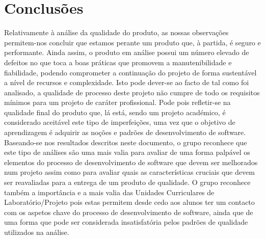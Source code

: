 \documentclass[openany,10pt,a4paper]{article}
\begin{document}
\section{Conclusões}
Relativamente à análise da qualidade do produto, as nossas observações permitem-nos concluir que estamos perante um produto que, à partida, é seguro e performante. Ainda assim, o produto em análise possui um número elevado de defeitos no que toca a boas práticas que promovem a manutenibilidade e fiabilidade, podendo comprometer a continuação do projeto de forma sustentável a nível de recursos e complexidade. 
Isto pode dever-se ao facto de tal como foi analisado, a qualidade de processo deste projeto não cumpre de todo os requisitos mínimos para um projeto de caráter profissional. Pode pois refletir-se na qualidade final do produto que, lá está, sendo um projeto académico, é considerado aceitável este tipo de imperfeições, uma vez que o objetivo de aprendizagem é adquirir as noções e padrões de desenvolvimento de software. \\
Baseando-se nos resultados descritos neste documento, o grupo reconhece que este tipo de análises são uma mais valia para avaliar de uma forma palpável os elementos do processo de desenvolvimento de software que devem ser melhorados num projeto assim como para avaliar quais as características cruciais que devem ser reavaliadas para a entrega de um produto de qualidade. O grupo reconhece também a importância e a mais valia das Unidades Curriculares de Laboratório/Projeto pois estas permitem desde cedo aos alunos ter um contacto com os aspetos chave do processo de desenvolvimento de software, ainda que de uma forma que pode ser considerada insatisfatória pelos padrões de qualidade utilizados na análise.

\renewcommand\bibname{Referências} %
\setlength{\parskip}{0.7em}


\end{document}
